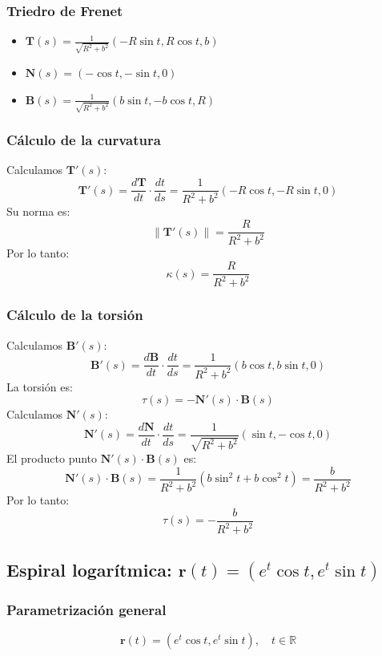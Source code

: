 \documentclass[11pt]{book}
\theoremstyle{definicion}
\theoremstyle{teorema}
\theoremstyle{ejemplo}
\begin{document}
\subsubsection{Triedro de Frenet}
\begin{itemize}
    \item \(\displaystyle \mathbf{T}(s) = \frac{1}{\sqrt{R^2 + b^2}}(-R\sin t, R\cos t, b)\)
    \item \(\displaystyle \mathbf{N}(s) = (-\cos t, -\sin t, 0)\)
    \item \(\displaystyle \mathbf{B}(s) = \frac{1}{\sqrt{R^2 + b^2}}(b\sin t, -b\cos t, R)\)
\end{itemize}

\subsubsection{Cálculo de la curvatura}
\noindent
Calculamos \(\mathbf{T}'(s)\):
\[
\mathbf{T}'(s) = \frac{d\mathbf{T}}{dt} \cdot \frac{dt}{ds} = \frac{1}{R^2 + b^2}(-R\cos t, -R\sin t, 0)
\]
Su norma es:
\[
\|\mathbf{T}'(s)\| = \frac{R}{R^2 + b^2}
\]
Por lo tanto:
\[
\kappa(s) = \frac{R}{R^2 + b^2}
\]

\subsubsection{Cálculo de la torsión}
\noindent
Calculamos \(\mathbf{B}'(s)\):
\[
\mathbf{B}'(s) = \frac{d\mathbf{B}}{dt} \cdot \frac{dt}{ds} = \frac{1}{R^2 + b^2}(b\cos t, b\sin t, 0)
\]
La torsión es:
\[
\tau(s) = -\mathbf{N}'(s) \cdot \mathbf{B}(s)
\]
Calculamos \(\mathbf{N}'(s)\):
\[
\mathbf{N}'(s) = \frac{d\mathbf{N}}{dt} \cdot \frac{dt}{ds} = \frac{1}{\sqrt{R^2 + b^2}}(\sin t, -\cos t, 0)
\]
El producto punto \(\mathbf{N}'(s) \cdot \mathbf{B}(s)\) es:
\[
\mathbf{N}'(s) \cdot \mathbf{B}(s) = \frac{1}{R^2 + b^2}(b\sin^2 t + b\cos^2 t) = \frac{b}{R^2 + b^2}
\]
Por lo tanto:
\[
\tau(s) = -\frac{b}{R^2 + b^2}
\]

\subsection{Espiral logarítmica: \(\mathbf{r}(t) = (e^t \cos t, e^t \sin t)\)}

\subsubsection{Parametrización general}
\[
\mathbf{r}(t) = (e^t \cos t, e^t \sin t), \quad t \in \mathbb{R}
\]
\end{document}
